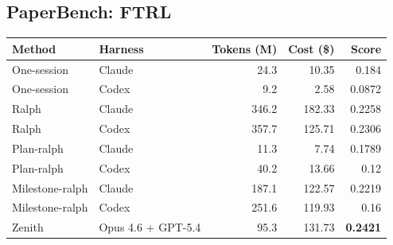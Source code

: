 \documentclass[11pt,a4paper]{article}
\newcommand{\code}[1]{#1}
\begin{document}
\subsection*{PaperBench: FTRL}

\noindent\begin{tabular}{@{}llrrr@{}}
\toprule
\rowcolor{tablehead}\textbf{\color{white}Method} & \textbf{\color{white}Harness} & \textbf{\color{white}Tokens (M)} & \textbf{\color{white}Cost (\$)} & \textbf{\color{white}Score} \\
\midrule
\code{One-session}    & Claude              & 24.3  & 10.35   & 0.184 \\
\rowcolor{tableband}
\code{One-session}    & Codex               & 9.2   & 2.58    & 0.0872 \\
\code{Ralph}          & Claude              & 346.2 & 182.33  & 0.2258 \\
\rowcolor{tableband}
\code{Ralph}          & Codex               & 357.7 & 125.71  & 0.2306 \\
\code{Plan-ralph}     & Claude              & 11.3  & 7.74    & 0.1789 \\
\rowcolor{tableband}
\code{Plan-ralph}     & Codex               & 40.2  & 13.66   & 0.12 \\
\code{Milestone-ralph}& Claude              & 187.1 & 122.57  & 0.2219 \\
\rowcolor{tableband}
\code{Milestone-ralph}& Codex               & 251.6 & 119.93  & 0.16 \\
\code{Zenith}         & Opus 4.6 + GPT-5.4  & 95.3  & 131.73  & \textbf{0.2421} \\
\bottomrule
\end{tabular}
\end{document}
